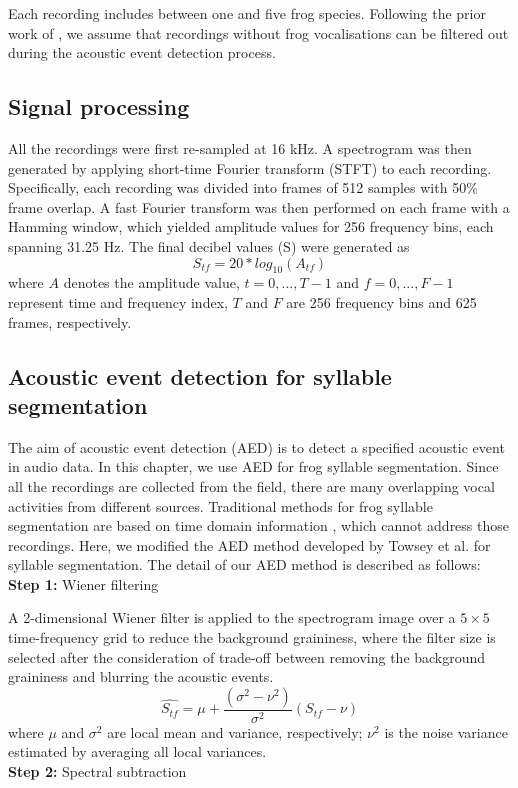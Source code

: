 Each recording includes between one and five frog species. Following the prior work of \citep{briggs2012acoustic}, we assume that recordings without frog vocalisations can be filtered out during the acoustic event detection process.


\subsection{Signal processing}
All the recordings were first re-sampled at 16 kHz. A spectrogram was then generated by applying short-time Fourier transform (STFT) to each recording. Specifically, each recording was
divided into frames of 512 samples with 50\% frame overlap.
A fast Fourier transform was then performed on each frame with a Hamming window, which yielded amplitude values for 256 frequency bins, each spanning 31.25 Hz. The final
decibel values (S) were generated as 
\begin{equation}
S_{tf} = 20*log_{10}(A_{tf})
\end{equation}
where $A$ denotes the amplitude value, $t=0,...,T-1$ and $f=0,...,F-1$ represent time and frequency index, $T$ and $F$ are 256 frequency bins and 625 frames, respectively. 

\subsection{Acoustic event detection for syllable segmentation}
\label{Ch5:AEDmethod}

The aim of acoustic event detection (AED) is to detect a specified acoustic event in audio data. In this chapter, we use AED for frog syllable segmentation. Since all the recordings are collected from the field, there are many overlapping vocal activities from different sources. Traditional methods for frog syllable segmentation are based on time domain information \citep{somervuo2004classification,huang2009frog}, which cannot address those recordings. Here, we modified the AED method developed by Towsey et al. \citep{towsey2012toolbox} for syllable segmentation. The detail of our AED method is described as follows:
\\
\textbf{Step 1:} Wiener filtering 

\noindent A 2-dimensional Wiener filter is applied to the spectrogram image over a $5 \times 5$ time-frequency grid to reduce the background graininess, where the filter size is selected after the consideration of trade-off between removing the background graininess and blurring the acoustic events.
\begin{equation}
\hat{S_{tf}} = \mu + \frac{(\sigma^{2}-\nu^{2})}{\sigma^{2}}(S_{tf}-\nu)
\end{equation}
where $\mu$ and $\sigma^{2}$ are local mean and variance, respectively; $\nu^{2}$ is the noise variance estimated by averaging all local variances. 
\\
\textbf{Step 2:} Spectral subtraction


